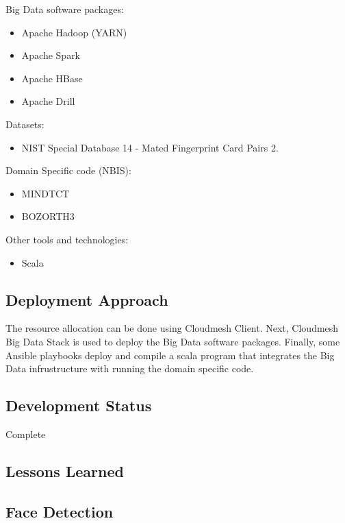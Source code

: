 \documentclass[9pt,twocolumn,twoside]{styles/osajnl}
\begin{document}
Big Data software packages:

\begin{itemize}
\item Apache Hadoop (YARN)
\item Apache Spark
\item Apache HBase
\item Apache Drill
\end{itemize}

Datasets:
\begin{itemize}
\item NIST Special Database 14 - Mated Fingerprint Card Pairs 2.
\end{itemize}

Domain Specific code (NBIS):
\begin{itemize}
\item MINDTCT
\item BOZORTH3
\end{itemize}


Other tools and technologies:
\begin{itemize}
\item Scala
\end{itemize}

\subsection{Deployment Approach}

The resource allocation can be done using Cloudmesh Client.
Next, Cloudmesh Big Data Stack is used to deploy the Big Data software packages.
Finally, some Ansible playbooks deploy and compile a scala program that integrates the Big Data infrustructure with running the domain specific code.

\subsection{Development Status}

Complete



\subsection{Lessons Learned}

\subsection{Face Detection}
\end{document}
